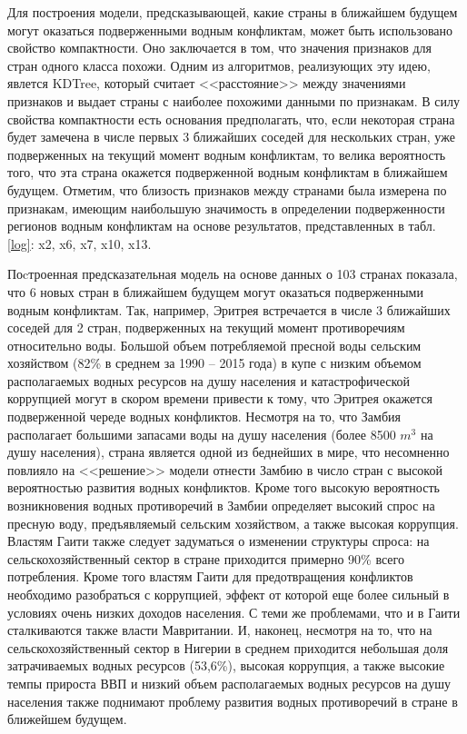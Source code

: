 \documentclass[a4paper, 12pt]{article}
\theoremstyle{plain} %
\theoremstyle{definition} %
\theoremstyle{remark} %
\begin{document}
Для построения модели, предсказывающей, какие страны в ближайшем будущем могут оказаться подверженными водным конфликтам, может быть использовано свойство компактности. Оно заключается в том, что значения признаков для стран одного класса похожи. Одним из алгоритмов, реализующих эту идею, явлется KDTree, который считает <<расстояние>> между значениями признаков и выдает страны с наиболее похожими данными по признакам. В силу свойства компактности есть основания предполагать, что, если некоторая страна будет замечена в числе первых 3 ближайших соседей для нескольких стран, уже подверженных на текущий момент водным конфликтам, то велика вероятность того, что эта страна окажется подверженной водным конфликтам в ближайшем будущем. Отметим, что близость признаков между странами была измерена по признакам, имеющим наибольшую значимость в определении подверженности регионов водным конфликтам на основе результатов, представленных в табл. \ref{log}: x2, x6, x7, x10, x13.

Поcтроенная предсказательная модель на основе данных о 103 странах показала, что 6 новых стран в ближайшем будущем могут оказаться подверженными водным конфликтам. Так, например, Эритрея встречается в числе 3 ближайших соседей для 2 стран, подверженных на текущий момент противоречиям относительно воды. Большой объем потребляемой пресной воды сельским хозяйством (82\% в среднем за 1990 – 2015 года)  в купе с низким объемом располагаемых водных ресурсов на душу населения и катастрофической коррупцией могут в скором времени привести к тому, что Эритрея окажется подверженной череде водных конфликтов. Несмотря на то, что Замбия располагает большими запасами воды на душу населения (более 8500 $m^3$ на душу населения), страна является одной из беднейших в мире, что несомненно повлияло на <<решение>> модели отнести Замбию в число стран с высокой вероятностью развития водных конфликтов. Кроме того высокую вероятность возникновения водных противоречий в Замбии определяет высокий спрос на пресную воду, предъявляемый сельским хозяйством, а также высокая коррупция. Властям Гаити также следует задуматься о изменении структуры спроса: на сельскохозяйственный сектор в стране приходится примерно 90\% всего потребления. Кроме того властям Гаити для предотвращения конфликтов необходимо разобраться с коррупцией, эффект от которой еще более сильный в условиях очень низких доходов населения. С теми же проблемами, что и в Гаити сталкиваются также власти Мавритании. И, наконец, несмотря на то, что на сельскохозяйственный сектор в Нигерии в среднем приходится небольшая доля затрачиваемых водных ресурсов (53,6\%), высокая коррупция, а также высокие темпы прироста ВВП и низкий объем располагаемых водных ресурсов на душу населения также поднимают проблему развития водных противоречий в стране в ближейшем будущем.
\end{document}

